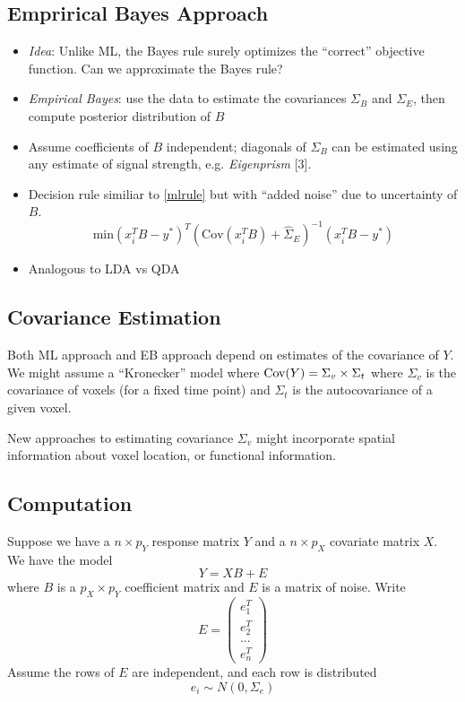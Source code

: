 \documentclass[12pt]{article}
\begin{document}
\subsection{Emprirical Bayes Approach}

\begin{itemize}
\item \emph{Idea}: Unlike ML, the Bayes rule surely optimizes the ``correct'' objective function.  Can we approximate the Bayes rule?
\item \emph{Empirical Bayes}: use the data to estimate the covariances
$\Sigma_B$ and $\Sigma_E$, then compute posterior distribution of $B$
\item Assume coefficients of $B$ independent; diagonals of $\Sigma_B$ can be estimated using any estimate of signal strength, e.g. \emph{Eigenprism} [3].
\item Decision rule similiar to \eqref{mlrule} but with ``added noise'' due to uncertainty of $B$.
\[
\text{min} (x_i^T B - y^*)^T (\text{Cov}(x_i^T B) + \hat{\Sigma}_E)^{-1} (x_i^T B - y^*)
\]
\item Analogous to LDA vs QDA
\end{itemize}

\subsection{Covariance Estimation}

Both ML approach and EB approach depend on estimates of the covariance of $Y$.
We might assume a ``Kronecker'' model where $\text{Cov}(Y) = \Sigma_v \times \Sigma_t$
where $\Sigma_v$ is the covariance of voxels (for a fixed time point)
and $\Sigma_t$ is the autocovariance of a given voxel.

New approaches to estimating covariance $\Sigma_v$ might incorporate
spatial information about voxel location, or functional information.

\subsection{Computation}

Suppose we have a $n \times p_Y$ response matrix $Y$ and a $n \times p_X$ covariate matrix $X$.
We have the model
$$
Y = XB + E
$$
where $B$ is a $p_X \times p_Y$ coefficient matrix and $E$ is a matrix of noise.
Write $$
E = \begin{pmatrix} e_1^T\\e_2^T\\ ... \\ e_n^T \end{pmatrix}
$$
Assume the rows of $E$ are independent, and each row is distributed
$$
e_i \sim N(0, \Sigma_e)
$$
\end{document}
